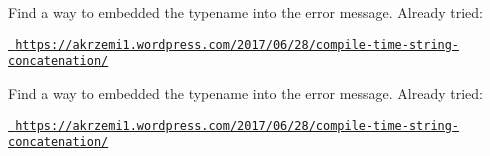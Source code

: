 
\begin{DoxyRefList}
\item[Class \mbox{\hyperlink{structts7_1_1jsonrpc_1_1_from_json}{ts7\+::jsonrpc\+::From\+Json$<$ T $>$}} ]\label{todo__todo000001}%
%
Find a way to embedded the typename into the error message. Already tried\+:
\begin{DoxyItemize}
\item \href{https://akrzemi1.wordpress.com/2017/06/28/compile-time-string-concatenation/}{\texttt{ https\+://akrzemi1.\+wordpress.\+com/2017/06/28/compile-\/time-\/string-\/concatenation/}} 
\end{DoxyItemize}
\item[Class \mbox{\hyperlink{structts7_1_1jsonrpc__playground_1_1json__call_1_1_from_json}{ts7\+::jsonrpc\+\_\+playground\+::json\+\_\+call\+::From\+Json$<$ T $>$}} ]\label{todo__todo000002}%
%
Find a way to embedded the typename into the error message. Already tried\+:
\begin{DoxyItemize}
\item \href{https://akrzemi1.wordpress.com/2017/06/28/compile-time-string-concatenation/}{\texttt{ https\+://akrzemi1.\+wordpress.\+com/2017/06/28/compile-\/time-\/string-\/concatenation/}}
\end{DoxyItemize}
\end{DoxyRefList}